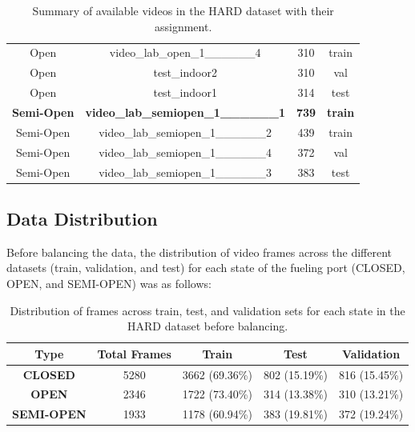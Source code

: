 \documentclass[12pt,oneside]{book} %
\begin{document}
\begin{table}[H]
\begin{tabular}{@{}cccc@{}}
        Open               & video\_lab\_open\_1\_\_\_\_\_\_4              & 310                       & train               \\
        Open               & test\_indoor2                                 & 310                       & val                 \\
        Open               & test\_indoor1                                 & 314                       & test                \\
        \textbf{Semi-Open} & \textbf{video\_lab\_semiopen\_1\_\_\_\_\_\_1} & \textbf{739}              & \textbf{train}      \\
        Semi-Open          & video\_lab\_semiopen\_1\_\_\_\_\_\_2          & 439                       & train               \\
        Semi-Open          & video\_lab\_semiopen\_1\_\_\_\_\_\_4          & 372                       & val                 \\ 
        Semi-Open          & video\_lab\_semiopen\_1\_\_\_\_\_\_3          & 383                       & test                \\ \bottomrule
    \end{tabular}
    \caption{\centering Summary of available videos in the HARD dataset with their assignment.}
    \label{tab:video_summary}
\end{table}

\subsection{Data Distribution}
Before balancing the data, the distribution of video frames across the
different datasets (train, validation, and test) for each state of the fueling
port (CLOSED, OPEN, and SEMI-OPEN) was as follows:
\begin{table}[H]
    \centering
    \begin{tabular}{@{}ccccc@{}}
        \toprule
        \textbf{Type}      & \textbf{Total Frames} & \textbf{Train} & \textbf{Test} & \textbf{Validation} \\ \midrule
        \textbf{CLOSED}    & 5280                  & 3662 (69.36\%) & 802 (15.19\%) & 816 (15.45\%)       \\ 
        \textbf{OPEN}      & 2346                  & 1722 (73.40\%) & 314 (13.38\%) & 310 (13.21\%)       \\ 
        \textbf{SEMI-OPEN} & 1933                  & 1178 (60.94\%) & 383 (19.81\%) & 372 (19.24\%)       \\ \bottomrule
    \end{tabular}
    \caption{\centering Distribution of frames across train, test, and validation sets for each state in the HARD dataset before balancing.}
    \label{tab:frame_distribution}
\end{table}
\end{document}
